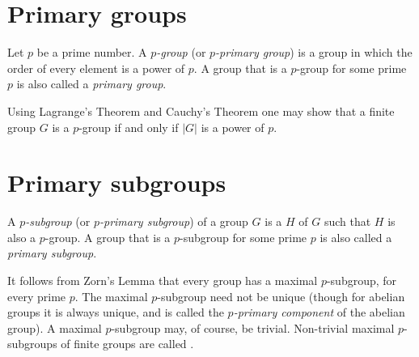 \documentclass[12pt]{article}
\begin{document}

\section*{Primary groups}

Let $p$ be a prime number.
A \emph{$p$-group} (or \emph{$p$-primary group}) is a group in which the order of every element is a power of $p$.
A group that is a $p$-group for some prime $p$ is also called a \emph{primary group}.

Using Lagrange's Theorem and Cauchy's Theorem one may show that a finite group $G$ is a $p$-group if and only if $|G|$ is a power of $p$.

\section*{Primary subgroups}

A \emph{$p$-subgroup} (or \emph{$p$-primary subgroup}) of a group $G$ is a  $H$ of $G$ such that $H$ is also a $p$-group.
A group that is a $p$-subgroup for some prime $p$ is also called a \emph{primary subgroup}.

It follows from Zorn's Lemma that every group has a maximal $p$-subgroup, for every prime $p$. The maximal $p$-subgroup need not be unique (though for abelian groups it is always unique, and is called the \emph{$p$-primary component} of the abelian group). A maximal $p$-subgroup may, of course, be trivial. Non-trivial maximal $p$-subgroups of finite groups are called .
\end{document}
